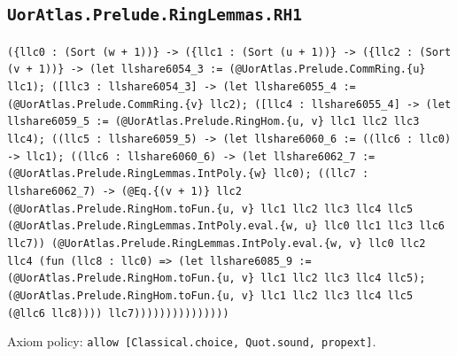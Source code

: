 \documentclass[11pt]{article}
\begin{document}
\subsection*{\texttt{UorAtlas.Prelude.RingLemmas.RH1}}
\noindent\texttt{(\{llc0 : (Sort (w + 1))\} -> (\{llc1 : (Sort (u + 1))\} -> (\{llc2 : (Sort (v + 1))\} -> (let llshare6054\_3 := (@UorAtlas.Prelude.CommRing.\{u\} llc1); ([llc3 : llshare6054\_3] -> (let llshare6055\_4 := (@UorAtlas.Prelude.CommRing.\{v\} llc2); ([llc4 : llshare6055\_4] -> (let llshare6059\_5 := (@UorAtlas.Prelude.RingHom.\{u, v\} llc1 llc2 llc3 llc4); ((llc5 : llshare6059\_5) -> (let llshare6060\_6 := ((llc6 : llc0) -> llc1); ((llc6 : llshare6060\_6) -> (let llshare6062\_7 := (@UorAtlas.Prelude.RingLemmas.IntPoly.\{w\} llc0); ((llc7 : llshare6062\_7) -> (@Eq.\{(v + 1)\} llc2 (@UorAtlas.Prelude.RingHom.toFun.\{u, v\} llc1 llc2 llc3 llc4 llc5 (@UorAtlas.Prelude.RingLemmas.IntPoly.eval.\{w, u\} llc0 llc1 llc3 llc6 llc7)) (@UorAtlas.Prelude.RingLemmas.IntPoly.eval.\{w, v\} llc0 llc2 llc4 (fun (llc8 : llc0) => (let llshare6085\_9 := (@UorAtlas.Prelude.RingHom.toFun.\{u, v\} llc1 llc2 llc3 llc4 llc5); (@UorAtlas.Prelude.RingHom.toFun.\{u, v\} llc1 llc2 llc3 llc4 llc5 (@llc6 llc8)))) llc7)))))))))))))))}\par
\noindent Axiom policy: \texttt{allow [Classical.choice, Quot.sound, propext]}.\par
\end{document}
